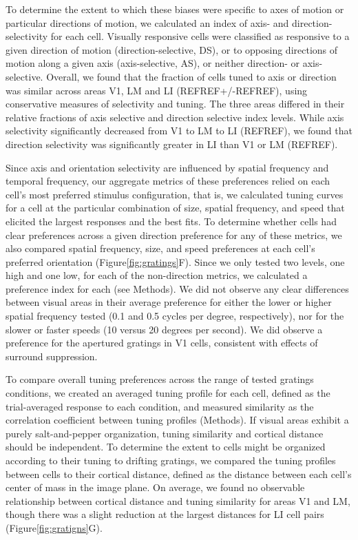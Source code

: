 To determine the extent to which these biases were specific to axes of motion or particular directions of motion, we calculated an index of axis- and direction-selectivity for each cell. Visually responsive cells were classified as responsive to a given direction of motion (direction-selective, DS), or to opposing directions of motion along a given axis (axis-selective, AS), or neither direction- or axis-selective. Overall, we found that the fraction of cells tuned to axis or direction was similar across areas V1, LM and LI (REFREF+/-REFREF), using conservative measures of selectivity and tuning. The three areas differed in their relative fractions of axis selective and direction selective index levels. While axis selectivity significantly decreased from V1 to LM to LI (REFREF), we found that direction selectivity was significantly greater in LI than V1 or LM (REFREF). 

Since axis and orientation selectivity are influenced by spatial frequency and temporal frequency\cite{REFREF}, our aggregate metrics of these preferences relied on each cell's most preferred stimulus configuration, that is, we calculated tuning curves for a cell at the particular combination of size, spatial frequency, and speed that elicited the largest responses and the best fits. To determine whether cells had clear preferences across a given direction preference for any of these metrics, we also compared spatial frequency, size, and speed preferences at each cell's preferred orientation (Figure\ref{fig:gratings}F). Since we only tested two levels, one high and one low, for each of the non-direction metrics, we calculated a preference index for each (see Methods). We did not observe any clear differences between visual areas in their average preference for either the lower or higher spatial frequency tested (0.1 and 0.5 cycles per degree, respectively), nor for the slower or faster speeds (10 versus 20 degrees per second). We did observe a preference for the apertured gratings in V1 cells, consistent with effects of surround suppression.

To compare overall tuning preferences across the range of tested gratings conditions, we created an averaged tuning profile for each cell, defined as the trial-averaged response to each condition, and measured similarity as the correlation coefficient between tuning profiles (Methods). If visual areas exhibit a purely salt-and-pepper organization, tuning similarity and cortical distance should be independent. To determine the extent to cells might be organized according to their tuning to drifting gratings, we compared the tuning profiles between cells to their cortical distance, defined as the distance between each cell’s center of mass in the image plane. On average, we found no observable relationship between cortical distance and tuning similarity for areas V1 and LM, though there was a slight reduction at the largest distances for LI cell pairs (Figure\ref{fig:gratigns}G). 

